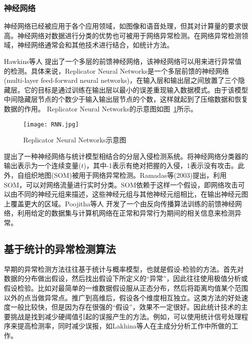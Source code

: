 \subsubsection{神经网络}

神经网络已经被应用于各个应用领域，如图像和语音处理，但其对计算量的要求很高。神经网络对数据进行分类的优势也可被用于网络异常检测。在网络异常检测领域，神经网络通常会和其他技术进行结合，如统计方法。

Hawkins等人\cite{hawk2002Outlier} 提出了一个多层的前馈神经网络，该神经网络可以用来进行异常值的检测。具体来说，Replicator Neural Networks是一个多层前馈的神经网络 (multi-layer feed-forward neural networks)，在输入层和输出层之间放置了三个隐藏层。它的目标是通过训练在输出层以最小的误差重现输入数据模式。由于该模型中间隐藏层节点的个数少于输入输出层节点的个数，这样就起到了压缩数据和恢复数据的作用。
Replicator Neural Networks的示意图如图~\ref{fig:rnn}所示。

\begin{figure}
    \centering
    \texttt{[image: RNN.jpg]}
    \caption{Replicator Neural Networks示意图}
    \label{fig:rnn}
  \end{figure}


\citet{2001HIDE} 提出了一种神经网络与统计模型相结合的分层入侵检测系统。将神经网络分类器的输出表示为一个连续变量($t$)，其中-1表示有绝对把握的入侵，1表示没有攻击。此外，自组织地图(SOM)被用于网络异常检测。Ramadas等(2003)提出，利用SOM，可以对网络流量进行实时分类。SOM依赖于这样一个假设，即网络攻击可以由不同的神经元组来描述，这些神经元组与其他神经元组相比，在输出神经元图上覆盖更大的区域。Poojitha等人\cite{Poojitha2010} 开发了一个由反向传播算法训练的前馈神经网络，利用给定的数据集与计算机网络在正常和异常行为期间的相关信息来检测异常。

\subsection{基于统计的异常检测算法}

早期的异常检测方法往往基于统计与概率模型，也就是假设-检验的方法。首先对数据的分布做出假设，然后找出假设下所定义的“异常”，因此往往使用极值分析或假设检验。比如对最简单的一维数据假设服从正态分布，然后将距离均值某个范围以外的点当做异常点。推广到高维后，假设各个维度相互独立。这类方法的好处速度一般比较快，但是因为存在很强的“假设”，效果不一定很好。因此统计技术的主要挑战是找到减少硬阈值引起的误报产生的方法\cite{cormode2010algorithms}。例如，可以使用统计信号处理程序来提高检测率，同时减少误报，如Lakhina等人在主成分分析工作中所做的工作\cite{lakhina2004diagnosing,lakhina2004structural,lakhina2005mining}。

